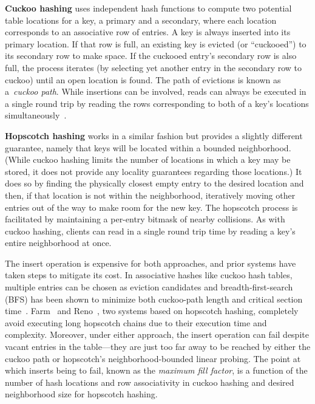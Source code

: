 \documentclass[12pt]{ucsddissertation}
\begin{document}

\textbf{Cuckoo hashing} uses independent hash functions to compute two
potential table locations for a key, a primary and a secondary, where
each location corresponds to an associative row of entries.  A key is
always inserted into its primary location.  If that row is full, an
existing key is evicted (or ``cuckooed'') to its secondary row to make
space. If the cuckooed entry's secondary row is also full, the process
iterates (by selecting yet another entry in the secondary row to
cuckoo) until an open location is found. The path of evictions is
known as a~\textit{cuckoo path}.  While insertions can be involved,
reads can always be executed in a single round trip by reading the
rows corresponding to both of a key's locations
simultaneously~\cite{pilaf}.

\textbf{Hopscotch hashing} works in a similar fashion but provides a
slightly different guarantee, namely that keys will be located within
a bounded neighborhood.  (While cuckoo hashing limits the number of
locations in which a key may be stored, it does not provide any
locality guarantees regarding those locations.) It does so by finding
the physically closest empty entry to the desired location and then,
if that location is not within the neighborhood, iteratively
moving other entries out of the way to make room for the new key.
The hopscotch process is facilitated by maintaining a per-entry
bitmask of nearby collisions.  As with cuckoo hashing, clients can read in a single round trip time by reading a key's entire
neighborhood at once.

The insert operation is expensive for both approaches, and prior
systems have taken steps to mitigate its cost.  In associative hashes
like cuckoo hash tables, multiple entries can be chosen as eviction
candidates and breadth-first-search (BFS) has been shown to minimize
both cuckoo-path length and critical section
time~\cite{memc3,cuckoo-improvements}.
Farm~\cite{farm} and Reno~\cite{reno}, two systems based on hopscotch
hashing, completely avoid executing long hopscotch chains due to their
execution time and complexity.  Moreover, under either approach, the
insert operation can fail despite vacant entries in the table---they
are just too far away to be reached by either the cuckoo path or
hopscotch's neighborhood-bounded linear probing.  The point at which
inserts being to fail, known as the \emph{maximum fill factor}, is a
function of the number of hash locations and row associativity in
cuckoo hashing and desired neighborhood size for hopscotch hashing.
\end{document}

